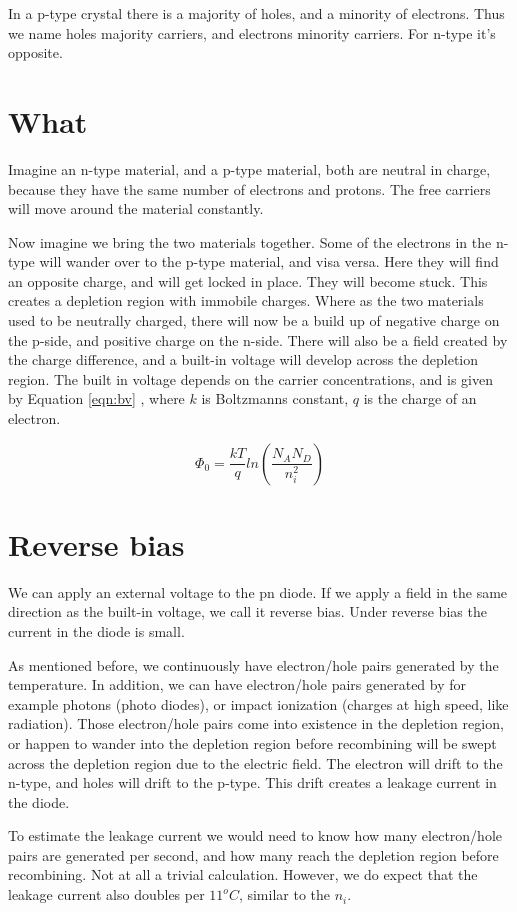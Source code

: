 \documentclass[technote,10pt,a4paper]{IEEEtran}
\newcommand{\req}[1]{Equation \ref{eqn:#1} }
\newcommand{\eqnr}[2]{
  \begin{equation}
    #1
    \label{eqn:#2}
  \end{equation}}
\begin{document}
In a p-type crystal there is a majority of holes, and a minority of electrons.
Thus we name holes majority carriers, and electrons minority carriers. For
n-type it's opposite.

\section{What}
Imagine an n-type material, and a p-type material, both are neutral in charge,
because they have the same number of electrons and protons. The free carriers
will move around the material constantly.

Now imagine we bring the two materials together. Some of the electrons in the
n-type will wander over to the p-type material, and visa versa. Here they will
find an opposite charge, and will get locked in place. They will become stuck. This creates a depletion region with immobile charges.
Where as the two materials used to be neutrally charged, there will now be a
build up of negative charge on the p-side, and positive charge on the n-side.
 There will also be a
field created by the charge difference, and a built-in voltage will develop
across the depletion region. The built in voltage depends on the carrier
concentrations, and is given by \req{bv}, where $k$ is Boltzmanns constant, $q$ is
the charge of an electron.

\eqnr{ \Phi_0 = \frac{kT}{q} ln\left(  \frac{N_A N_D}{n_i^2} \right)}{bv}

\section{Reverse bias}
We can apply an external voltage to the pn diode. If we apply a field in the
same direction as the built-in voltage, we call it reverse bias. Under reverse
bias the current in the diode is small.

As mentioned before, we continuously
have electron/hole pairs generated by the temperature. In addition, we can have
electron/hole pairs generated by for example photons (photo diodes), or impact ionization
(charges at high speed, like radiation). Those electron/hole pairs come into
existence in the depletion region, or happen to wander into the depletion region
before recombining will be swept across the depletion region due to the electric
field.  The
electron will drift to the n-type, and holes will drift to the p-type. This
drift creates a leakage current in the diode.

To estimate the leakage current we would need to know how many electron/hole
pairs are generated per second, and how many reach the depletion region before
recombining. Not at all a trivial calculation. However, we do expect that the
leakage current also doubles per $11^{o}C$, similar to the $n_{i}$.
\end{document}
